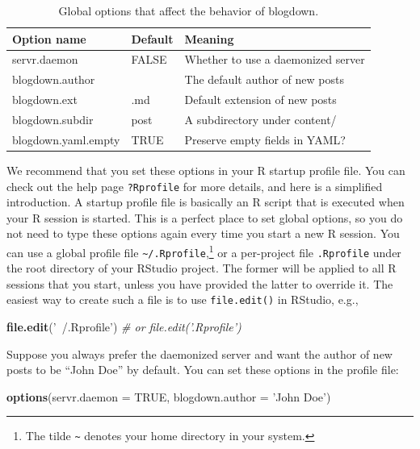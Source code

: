 \documentclass[12pt,]{krantz}
\makeatletter
\newenvironment{Shaded}{\begin{snugshade}}{\end{snugshade}}
\newcommand{\KeywordTok}[1]{\textcolor[rgb]{0.13,0.29,0.53}{\textbf{#1}}}
\newcommand{\DataTypeTok}[1]{\textcolor[rgb]{0.13,0.29,0.53}{#1}}
\newcommand{\StringTok}[1]{\textcolor[rgb]{0.31,0.60,0.02}{#1}}
\newcommand{\CommentTok}[1]{\textcolor[rgb]{0.56,0.35,0.01}{\textit{#1}}}
\newcommand{\OtherTok}[1]{\textcolor[rgb]{0.56,0.35,0.01}{#1}}
\newcommand{\NormalTok}[1]{#1}
\newenvironment{kframe}{%
\medskip{}
\setlength{\fboxsep}{.8em}
 \def\at@end@of@kframe{}%
 \ifinner\ifhmode%
  \def\at@end@of@kframe{\end{minipage}}%
  \begin{minipage}{\columnwidth}%
 \fi\fi%
 \def\FrameCommand##1{\hskip\@totalleftmargin \hskip-\fboxsep
 \colorbox{shadecolor}{##1}\hskip-\fboxsep
     \hskip-\linewidth \hskip-\@totalleftmargin \hskip\columnwidth}%
 \MakeFramed {\advance\hsize-\width
   \@totalleftmargin\z@ \linewidth\hsize
   \@setminipage}}%
 {\par\unskip\endMakeFramed%
 \at@end@of@kframe}
\renewenvironment{Shaded}{\begin{kframe}}{\end{kframe}}
\theoremstyle{definition}
\theoremstyle{definition}
\theoremstyle{definition}
\theoremstyle{remark}
\makeatother
\begin{document}
\begin{table}

\caption{\label{tab:global-options}Global options that affect the behavior of blogdown.}
\centering
\begin{tabular}[t]{lll}
\toprule
Option name & Default & Meaning\\
\midrule
servr.daemon & FALSE & Whether to use a daemonized server\\
blogdown.author &  & The default author of new posts\\
blogdown.ext & .md & Default extension of new posts\\
blogdown.subdir & post & A subdirectory under content/\\
blogdown.yaml.empty & TRUE & Preserve empty fields in YAML?\\
\bottomrule
\end{tabular}
\end{table}

We recommend that you set these options in your R startup profile file.
You can check out the help page \texttt{?Rprofile} for more details, and
here is a simplified introduction. A startup profile file is basically
an R script that is executed when your R session is started. This is a
perfect place to set global options, so you do not need to type these
options again every time you start a new R session. You can use a global
profile file \texttt{\textasciitilde{}/.Rprofile},\footnote{The tilde
  \texttt{\textasciitilde{}} denotes your home directory in your system.}
or a per-project file \texttt{.Rprofile} under the root directory of
your RStudio project. The former will be applied to all R sessions that
you start, unless you have provided the latter to override it. The
easiest way to create such a file is to use \texttt{file.edit()} in
RStudio, e.g.,

\begin{Shaded}
\begin{Highlighting}[]
\KeywordTok{file.edit}\NormalTok{(}\StringTok{'~/.Rprofile'}\NormalTok{)}
\CommentTok{# or file.edit('.Rprofile')}
\end{Highlighting}
\end{Shaded}

Suppose you always prefer the daemonized server and want the author of
new posts to be ``John Doe'' by default. You can set these options in
the profile file:

\begin{Shaded}
\begin{Highlighting}[]
\KeywordTok{options}\NormalTok{(}\DataTypeTok{servr.daemon =} \OtherTok{TRUE}\NormalTok{, }\DataTypeTok{blogdown.author =} \StringTok{'John Doe'}\NormalTok{)}
\end{Highlighting}
\end{Shaded}
\end{document}

